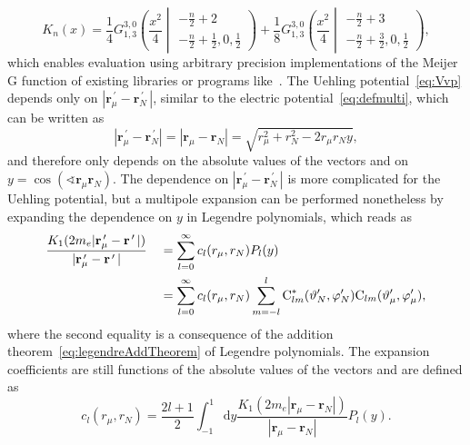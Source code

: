 \begin{equation}
K_n(x)=\frac{1}{4} {G_{1, 3}^{3, 0}\left({\frac{x^{2}}{4}}\middle|\begin{matrix}   - \frac{n}{2} + 2 \\- \frac{n}{2} + \frac{1}{2}, 0, \frac{1}{2}   \end{matrix}   \right)} + \frac{1}{8} {G_{1, 3}^{3, 0}\left(\frac{x^2}{4}\middle| \begin{matrix}   - \frac{n}{2} + 3 \\- \frac{n}{2} + \frac{3}{2}, 0, \frac{1}{2}   \end{matrix}  \right)},
\label{eq:defKnAnalyt}
\end{equation}
which enables evaluation using arbitrary precision implementations of the Meijer G function of existing libraries or programs like~\cite{Mathematica,mpmath}. The Uehling potential~\eqref{eq:Vvp} depends only on $|\mathbf{r}_\mu^{\,\prime} - \mathbf{r}_N^{\,\prime}\,|$, similar to the electric potential~\eqref{eq:defmulti}, which can be written as
\begin{equation}
|\mathbf{r}_\mu^{\,\prime} - \mathbf{r}_N^{\,\prime}|
=|\mathbf{r}_\mu - \mathbf{r}_N|
=\sqrt{r_\mu^2 + r_N^2 - 2 r_\mu r_N y},
\end{equation}
and therefore only depends on the absolute values of the vectors and on ${y}{=}{\cos(\sphericalangle \mathbf{r}_\mu\mathbf{r}_N)}$. The dependence on $|\mathbf{r}_\mu^{\,\prime} - \mathbf{r}_N^{\,\prime}\,|$ is more complicated for the Uehling potential, but a multipole expansion can be performed nonetheless by expanding the dependence on $y$ in Legendre polynomials, which reads as
\begin{alignat}{2}
&\frac{K_1(2m_e{|\mathbf{r}_\mu^{\,\prime} - \mathbf{r}^{\,\prime}\,|})}{|\mathbf{r}_\mu^{\,\prime} - \mathbf{r}^{\,\prime}\,|}
&&=\sum_{l=0}^\infty c_l(r_\mu,r_N) P_l(y)\\
&&&=\sum_{l=0}^\infty c_l(r_\mu,r_N) \sum_{m=-l}^l \text{C}^*_{lm}(\vartheta_N^{\prime},\varphi_N^{\prime})\text{C}_{lm}(\vartheta_\mu^\prime,\varphi_\mu^\prime),\notag
\end{alignat}
where the second equality is a consequence of the addition theorem~\eqref{eq:legendreAddTheorem} of Legendre polynomials. The expansion coefficients are still functions of the absolute values of the vectors and are defined as
\begin{equation}
c_l(r_\mu,r_N)=\frac{2l+1}{2} \int_{-1}^1 \text{d}y \frac{K_1(2m_e{|\mathbf{r}_\mu - \mathbf{r}_N|})}{|\mathbf{r}_\mu - \mathbf{r}_N|} P_l(y).
\label{eq:defcl}
\end{equation}
